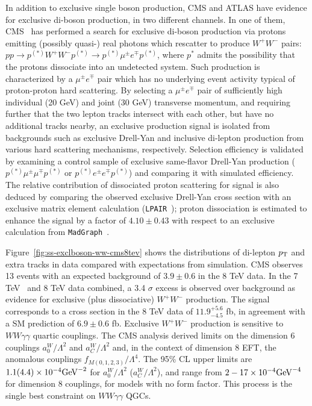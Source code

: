 
In addition to exclusive single boson production, CMS and ATLAS have
evidence for exclusive di-boson production, in two different channels.
In one of them, CMS~\cite{Khachatryan:2016mud} has performed a search
for exclusive di-boson production via protons emitting (possibly
quasi-) real photons which rescatter to produce $W^+W^-$ pairs:
$pp \to p^{(*)}W^+ W^- p^{(*)} \to p^{(*)}\mu^{\pm}e^{\mp}p^{(*)}$,
where $p^*$ admits the possibility that the protons dissociate into an
undetected system.  Such production is characterized by a
$\mu^{\pm}e^{\mp}$ pair which has no underlying event activity typical
of proton-proton hard scattering.  By selecting a $\mu^{\pm}e^{\mp}$
pair of sufficiently high individual (20 GeV) and joint (30 GeV)
transverse momentum, and requiring further that the two lepton tracks
intersect with each other, but have no additional tracks nearby, an
exclusive production signal is isolated from backgrounds such as
exclusive Drell-Yan and inclusive di-lepton production from various
hard scattering mechanisms, respectively.  Selection efficiency is
validated by examining a control sample of exclusive same-flavor
Drell-Yan production ($p^{(*)}\mu^{\pm}\mu^{\mp}p^{(*)}$ or
$p^{(*)}e^{\pm}e^{\mp}p^{(*)}$) and comparing it with simulated
efficiency.  The relative contribution of dissociated proton
scattering for signal is also deduced by comparing the observed
exclusive Drell-Yan cross section with an exclusive matrix element
calculation (\texttt{LPAIR}~\cite{Vermaseren:1982cz,Baranov:1991yq});
proton dissociation is estimated to enhance the signal by a factor of
$4.10 \pm 0.43$ with respect to an exclusive calculation
from \texttt{MadGraph}~\cite{Alwall:2011uj,Alwall:2014hca}.

Figure~\ref{fig:ss-exclboson-ww-cms8tev} shows the distributions of
di-lepton $p_{\mathrm{T}}$ and extra tracks in data compared with expectations
from simulation.  CMS observes 13 events with an expected background
of $3.9\pm0.6$ in the 8 TeV data.  In the 7
TeV~\cite{Chatrchyan:2013foa} and 8 TeV data combined, a 3.4 $\sigma$
excess is observed over background as evidence for exclusive (plus
dissociative) $W^+W^-$ production.  The signal corresponds to a cross
section in the 8 TeV data of $11.9^{+5.6}_{-4.5}$ fb, in agreement
with a SM prediction of $6.9\pm0.6$ fb.  Exclusive $W^+W^-$ production
is sensitive to $WW\gamma\gamma$ quartic couplings. The CMS analysis
derived limits on the dimension 6 couplings $a^W_0/\Lambda^2$ and
$a^W_C/\Lambda^2$ and, in the context of dimension 8 EFT, the
anomalous couplings $f_{M(0,1,2,3)}/\Lambda^4$.  The 95\% CL upper
limits are $1.1(4.4)\times 10^{-4} \rm{GeV}^{-2}$ for
$a^W_0/\Lambda^2$ ($a^W_C/\Lambda^2$), and range from $2-17 \times
10^{-4} \rm{GeV}^{-4}$ for dimension 8 couplings, for models with no
form factor.  This process is the single best constraint on
$WW\gamma\gamma$ QGCs.

